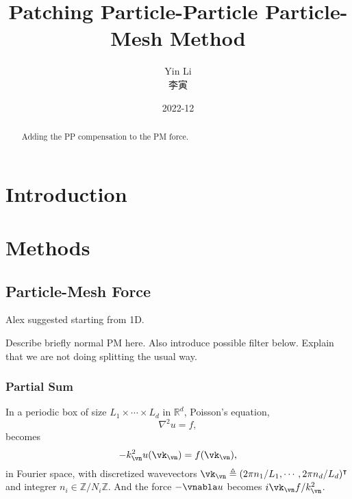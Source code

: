 \documentclass[a4paper]{article}
\newcommand{\gkai}[1]{\begin{CJK*}{UTF8}{gkai}\raisebox{.1em}{(}#1\raisebox{.1em}{)}\end{CJK*}}
\newcommand{\1}{\mathds{1}}
\newcommand{\YL}[1]{\textcolor{Bittersweet}{#1}}
\begin{document}
\title{Patching Particle-Particle Particle-Mesh Method}


\author{Yin Li \gkai{李寅}}


\date{2022-12}


\maketitle



\begin{abstract}
Adding the PP compensation to the PM force.
\end{abstract}



\section{Introduction}


\section{Methods}


\subsection{Particle-Mesh Force}


\YL{Alex suggested starting from 1D.}

\YL{Describe briefly normal PM here. Also introduce possible filter
below. Explain that we are not doing splitting the usual way.}


\subsubsection{Partial Sum}

In a periodic box of size $L_1 \times \cdots \times L_d$ in
$\mathbb{R}^d$, Poisson's equation,
%
\begin{equation}
\nabla^2 u = f,
\end{equation}
%
becomes
%
\begin{equation}
- k_\vn^2 u(\vk_\vn) = f(\vk_\vn),
\end{equation}
%
in Fourier space, with discretized wavevectors $\vk_\vn \triangleq (2\pi
n_1 / L_1, \cdots, 2\pi n_d / L_d )^\intercal$ and integrer $n_i \in
\mathbb{Z}/N_i\mathbb{Z}$.
And the force $- \vnabla u$ becomes $i \vk_\vn f / k_\vn^2$.
\end{document}
